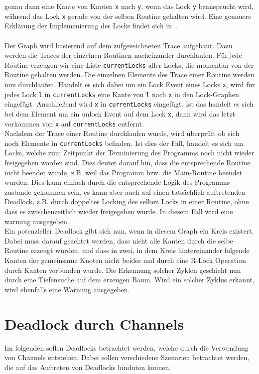 genau dann eine Kante von Knoten \texttt{x} nach \texttt{y}, wenn das Lock \texttt{y} beansprucht 
wird, während das Lock \texttt{x} gerade von der selben Routine gehalten wird. Eine 
genauere Erklärung der Implemenierung des Locks findet sich in~\cite{bachelor-project}.   \\\\
Der Graph wird basierend auf dem zufgezeichneten Trace aufgebaut. Dazu werden die Traces der 
einzelnen Routinen nacheinander durchlaufen. Für jede Routine erzeugen wir eine Liste \texttt{currentLocks} aller 
Locks, die momentan von der Routine gehalten werden. Die einzelnen Elemente des Trace einer 
Routine werden nun durchlaufen. Handelt es sich dabei um ein Lock Event eines Locks \texttt{x}, wird 
für jedes Lock \texttt{l} in \texttt{currentLocks} eine Kante von \texttt{l} nach \texttt{x} in den 
Lock-Graphen eingefügt. Anschließend wird \texttt{x} in \texttt{currentLocks} eingefügt.
Ist das handelt es sich bei dem Element um ein unlock Event auf dem Lock \texttt{x}, dann wird das 
letzt vorkommen von \texttt{x} auf \texttt{currentLocks} entfernt.\\
Nachdem der Trace einer Routine durchlaufen wurde, wird überprüft ob sich noch Elemente in 
\texttt{currentLocks} befinden. Ist dies der Fall, handelt es sich um Locks, welche zum Zeitpunkt der Terminierung 
des Programms noch nicht wieder freigegeben worden sind. Dies deutet darauf hin, dass die
entsprechende Routine nicht beendet wurde, z.B. weil das Programm bzw. die Main-Routine beendet wurden.
Dies kann einfach durch die entsprechende Logik des Programms zustande gekommen sein, es kann aber auch 
auf einen tatsächlich auftretenden Deadlock, z.B. durch doppeltes Locking des selben Locks in einer Routine, ohne dass 
es zwischenzeitlich wieder freigegeben wurde. In diesem Fall wird eine warnung ausgegeben.\\
Ein potenzieller Deadlock gibt sich nun, wenn in diesem Graph ein Kreis existert. Dabei muss darauf 
geachtet werden, dass nicht alle Kanten durch die selbe Routine erzeugt wurden, und dass in 
zwei, in dem Kreis hintereinander folgende Kanten der gemeinsame Knoten nicht beides mal durch eine 
R-Lock Operation durch Kanten verbunden wurde. Die Erkennung solcher Zyklen geschieht nun durch 
eine Tiefensuche auf dem erzeugen Baum. Wird ein solcher Zyklus erkannt, wird ebenfalls eine 
Warnung ausgegeben.


\section{Deadlock durch Channels}\label{Chap:Analyse-Sec:Channel}
Im folgenden sollen Deadlocks betrachtet werden, welche durch die Verwendung von Channels entstehen. Dabei sollen verschiedene 
Szenarien betrachtet werden, die auf das Auftreten von Deadlocks hinduten können. 

